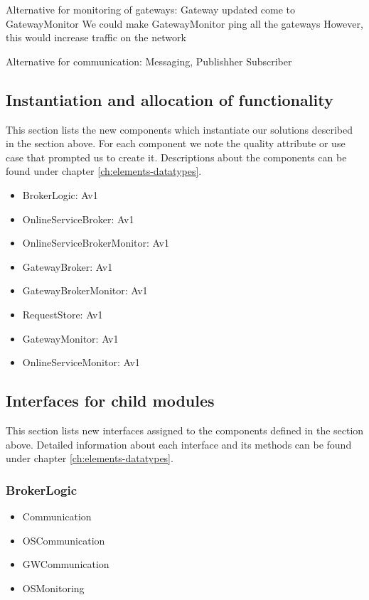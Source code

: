     Alternative for monitoring of gateways:
        Gateway updated come to GatewayMonitor
        We could make GatewayMonitor ping all the gateways
        However, this would increase traffic on the network

    Alternative for communication:
        Messaging, Publishher Subscriber


\subsection{Instantiation and allocation of functionality}
    This section lists the new components which instantiate our solutions
    described in the section above. For each component we note the quality
    attribute or use case that prompted us to create it. Descriptions about
    the components can be found under chapter \ref{ch:elements-datatypes}. \\

    \begin{itemize}
        \item BrokerLogic: Av1
        \item OnlineServiceBroker: Av1
        \item OnlineServiceBrokerMonitor: Av1
        \item GatewayBroker: Av1
        \item GatewayBrokerMonitor: Av1
        \item RequestStore: Av1
        \item GatewayMonitor: Av1
        \item OnlineServiceMonitor: Av1
    \end{itemize}


\subsection{Interfaces for child modules}
    This section lists new interfaces assigned to the components defined
    in the section above. Detailed information about each interface and
    its methods can be found under chapter \ref{ch:elements-datatypes}.

    \subsubsection{BrokerLogic}
        \begin{itemize}
            \item Communication
            \item OSCommunication
            \item GWCommunication
            \item OSMonitoring
        \end{itemize}

